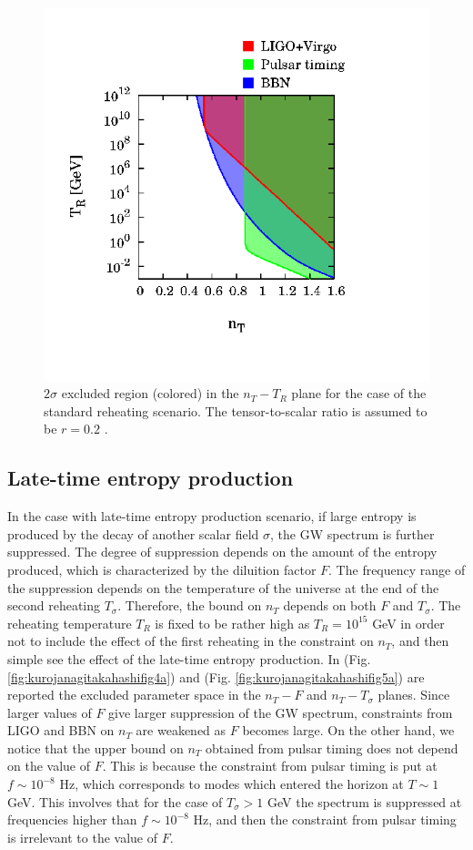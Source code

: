 \documentclass[11pt,a4paper,twoside]{book}
\begin{document}
\begin{figure}
	\centering
	\includegraphics[width=0.75\linewidth, height=0.35\textheight]{Images/Chap3/Kurojanagi_Takahashi_Fig3}
	\caption{$ 2\sigma $ excluded region (colored) in the $ n_{T}-T_{R} $ plane for the case of the standard reheating scenario. The tensor-to-scalar ratio is assumed to be $ r=0.2 $ \cite{Chap3:BlueTiltedSpectrum}.}
	\label{fig:kurojanagitakahashifig3}
\end{figure}
\subsection*{Late-time entropy production}
In the case with late-time entropy production scenario, if large entropy is produced by the decay of another scalar field $\sigma$, the GW spectrum is further suppressed. The degree of suppression depends on the amount of the entropy produced, which is characterized by the diluition factor $ F $. The frequency range of the suppression depends on the temperature of the universe at the end of the second reheating $ T_{\sigma} $. Therefore, the bound on $ n_{T} $ depends on both $ F $ and $ T_{\sigma} $. The reheating temperature $ T_{R} $ is fixed  to be rather high as $ T_{R}=10^{15} $ GeV in order not to include the effect of the first reheating in the constraint on $ n_{T} $, and then simple see the effect of the late-time entropy production. In (Fig. \ref{fig:kurojanagitakahashifig4a}) and (Fig. \ref{fig:kurojanagitakahashifig5a}) are reported the excluded parameter space in the $ n_{T}-F $
 and $ n_{T}-T_{\sigma} $ planes. Since larger values of $ F $ give larger suppression of the GW spectrum, constraints from LIGO and BBN on $ n_{T} $ are weakened as $ F $ becomes large. On the other hand, we notice that the upper bound on $ n_{T} $ obtained from pulsar timing does not depend on the value of $ F $. This is because the constraint from pulsar timing is put at $ f \sim 10^{-8} $ Hz, which corresponds to  modes  which entered the horizon at $ T \sim 1 $ GeV. This involves that for the case of $ T_{\sigma} > 1 $ GeV the spectrum is suppressed at frequencies higher than $ f \sim 10^{-8} $ Hz, and then the constraint from pulsar timing is irrelevant to the value of $ F $.
 
\end{document}
